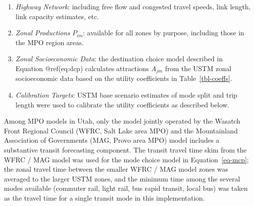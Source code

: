 \documentclass[
  letterpaper,
]{trb}
\providecommand{\tightlist}{%
  \setlength{\itemsep}{0pt}\setlength{\parskip}{0pt}}\usepackage{longtable,booktabs,array}
\begin{document}
\begin{enumerate}
\def\labelenumi{\arabic{enumi}.}
\tightlist
\item
  \emph{Highway Network}: including free flow and congested travel
  speeds, link length, link capacity estimates, etc.
\item
  \emph{Zonal Productions} \(P_{im}\): available for all zones by
  purpose, including those in the MPO region areas.
\item
  \emph{Zonal Socioeconomic Data}: the destination choice model
  described in Equation @ref(eq:dcp) calculates attractions \(A_{jm}\)
  from the USTM zonal socioeconomic data based on the utility
  coefficients in Table~\ref{tbl-coeffs}.
\item
  \emph{Calibration Targets}: USTM base scenario estimates of mode split
  and trip length were used to calibrate the utility coefficients as
  described below.
\end{enumerate}

Among MPO models in Utah, only the model jointly operated by the Wasatch
Front Regional Council (WFRC, Salt Lake area MPO) and the Mountainland
Association of Governments (MAG, Provo area MPO) model includes a
substantive transit forecasting component. The transit travel time skim
from the WFRC / MAG model was used for the mode choice model in
Equation~\ref{eq-mcp}; the zonal travel time between the smaller WFRC /
MAG model zones was averaged to the larger USTM zones, and the minimum
time among the several modes available (commuter rail, light rail, bus
rapid transit, local bus) was taken as the travel time for a single
transit mode in this implementation.
\end{document}
